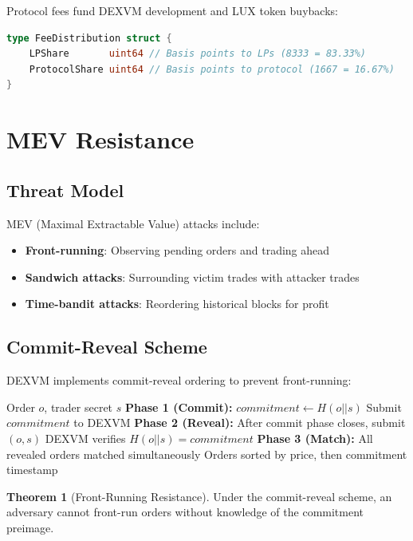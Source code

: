 \documentclass[11pt,a4paper]{article}
\theoremstyle{definition}
\newtheorem{theorem}{Theorem}
\begin{document}
Protocol fees fund DEXVM development and LUX token buybacks:

\begin{lstlisting}[language=Go]
type FeeDistribution struct {
    LPShare       uint64 // Basis points to LPs (8333 = 83.33%)
    ProtocolShare uint64 // Basis points to protocol (1667 = 16.67%)
}
\end{lstlisting}

\section{MEV Resistance}

\subsection{Threat Model}

MEV (Maximal Extractable Value) attacks include:
\begin{itemize}
    \item \textbf{Front-running}: Observing pending orders and trading ahead
    \item \textbf{Sandwich attacks}: Surrounding victim trades with attacker trades
    \item \textbf{Time-bandit attacks}: Reordering historical blocks for profit
\end{itemize}

\subsection{Commit-Reveal Scheme}

DEXVM implements commit-reveal ordering to prevent front-running:

\begin{algorithm}
\caption{Commit-Reveal Order Submission}
\begin{algorithmic}[1]
\Require Order $o$, trader secret $s$
\State \textbf{Phase 1 (Commit):}
\State $commitment \gets H(o || s)$
\State Submit $commitment$ to DEXVM
\State \textbf{Phase 2 (Reveal):}
\State After commit phase closes, submit $(o, s)$
\State DEXVM verifies $H(o || s) = commitment$
\State \textbf{Phase 3 (Match):}
\State All revealed orders matched simultaneously
\State Orders sorted by price, then commitment timestamp
\end{algorithmic}
\end{algorithm}

\begin{theorem}[Front-Running Resistance]
Under the commit-reveal scheme, an adversary cannot front-run orders without knowledge of the commitment preimage.
\end{theorem}
\end{document}
